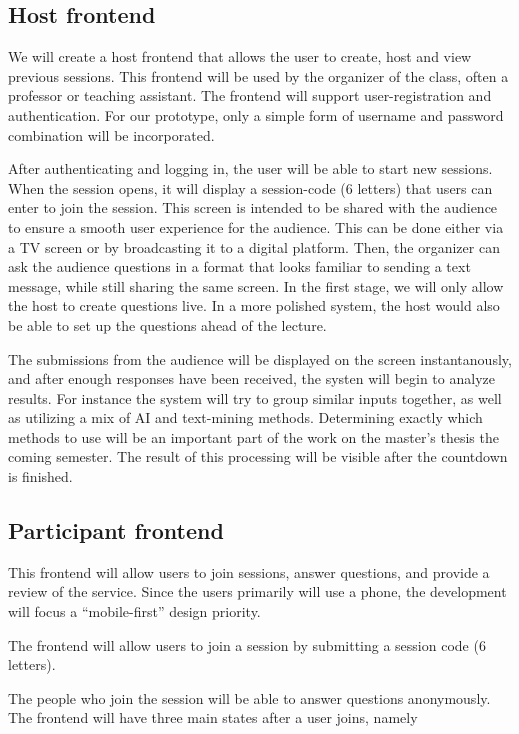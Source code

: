 \subsection{Host frontend}
We will create a host frontend that allows the user to create, host and view previous sessions. This frontend will be used by the organizer of the class, often a professor or teaching assistant. The frontend will support user-registration and authentication. For our prototype, only a simple form of username and password combination will be incorporated.

After authenticating and logging in, the user will be able to start new sessions. When the session opens, it will display a session-code (6 letters) that users can enter to join the session. This screen is intended to be shared with the audience to ensure a smooth user experience for the audience. This can be done either via a TV screen or by broadcasting it to a digital platform. Then, the organizer can ask the audience questions in a format that looks familiar to sending a text message, while still sharing the same screen. In the first stage, we will only allow the host to create questions live. In a more polished system, the host would also be able to set up the questions ahead of the lecture.

The submissions from the audience will be displayed on the screen instantanously, and after enough responses have been received, the systen will begin to analyze results. For instance the system will try to group similar inputs together, as well as utilizing a mix of AI and text-mining methods. Determining exactly which methods to use will be an important part of the work on the master's thesis the coming semester. The result of this processing will be visible after the countdown is finished.


\subsection{Participant frontend}
This frontend will allow users to join sessions, answer questions, and provide a review of the service. Since the users primarily will use a phone, the development will focus a “mobile-first” design priority. 

The frontend will allow users to join a session by submitting a session code (6 letters).

The people who join the session will be able to answer questions anonymously. The frontend will have three main states after a user joins, namely 

